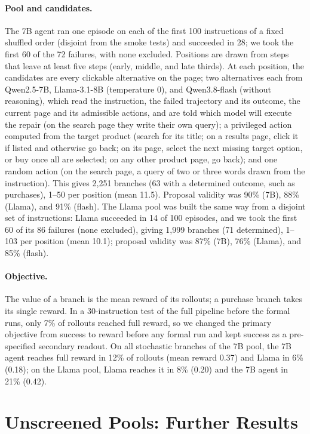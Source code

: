 \documentclass{article}
\theoremstyle{plain}
\theoremstyle{definition}
\theoremstyle{remark}
\begin{document}
\paragraph{Pool and candidates.}
The 7B agent ran one episode on each of the first 100 instructions of a fixed shuffled order (disjoint from the smoke tests) and succeeded in 28; we took the first 60 of the 72 failures, with none excluded. Positions are drawn from steps that leave at least five steps (early, middle, and late thirds). At each position, the candidates are every clickable alternative on the page; two alternatives each from Qwen2.5-7B, Llama-3.1-8B (temperature 0), and Qwen3.8-flash (without reasoning), which read the instruction, the failed trajectory and its outcome, the current page and its admissible actions, and are told which model will execute the repair (on the search page they write their own query); a privileged action computed from the target product (search for its title; on a results page, click it if listed and otherwise go back; on its page, select the next missing target option, or buy once all are selected; on any other product page, go back); and one random action (on the search page, a query of two or three words drawn from the instruction). This gives 2,251 branches (63 with a determined outcome, such as purchases), 1--50 per position (mean 11.5). Proposal validity was 90\% (7B), 88\% (Llama), and 91\% (flash). The Llama pool was built the same way from a disjoint set of instructions: Llama succeeded in 14 of 100 episodes, and we took the first 60 of its 86 failures (none excluded), giving 1,999 branches (71 determined), 1--103 per position (mean 10.1); proposal validity was 87\% (7B), 76\% (Llama), and 85\% (flash).

\paragraph{Objective.}
The value of a branch is the mean reward of its rollouts; a purchase branch takes its single reward. In a 30-instruction test of the full pipeline before the formal runs, only 7\% of rollouts reached full reward, so we changed the primary objective from success to reward before any formal run and kept success as a pre-specified secondary readout. On all stochastic branches of the 7B pool, the 7B agent reaches full reward in 12\% of rollouts (mean reward 0.37) and Llama in 6\% (0.18); on the Llama pool, Llama reaches it in 8\% (0.20) and the 7B agent in 21\% (0.42).

\section{Unscreened Pools: Further Results}
\label{app:unscreened}
\end{document}
